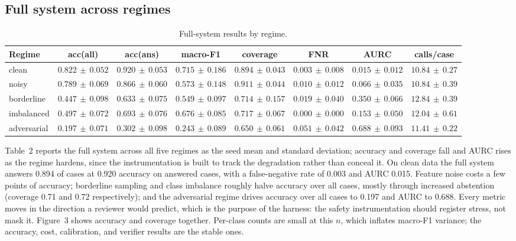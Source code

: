 \documentclass[12pt]{article}
\begin{document}
\subsection{Full system across regimes}
\begin{table}[htbp]
\centering
\small
\renewcommand{\arraystretch}{1.25}
\setlength{\tabcolsep}{5pt}
\begin{adjustbox}{max width=\linewidth}
\begin{tabular}{|l|c|c|c|c|c|c|c|}
\hline
\rowcolor{tblhead}
\textbf{Regime} & \textbf{acc(all)} & \textbf{acc(ans)} & \textbf{macro-F1} & \textbf{coverage} & \textbf{FNR} & \textbf{AURC} & \textbf{calls/case} \\ \hline
clean & $0.822\,{\pm}\,0.052$ & $0.920\,{\pm}\,0.053$ & $0.715\,{\pm}\,0.186$ & $0.894\,{\pm}\,0.043$ & $0.003\,{\pm}\,0.008$ & $0.015\,{\pm}\,0.012$ & $10.84\,{\pm}\,0.27$ \\
\hline
noisy & $0.789\,{\pm}\,0.069$ & $0.866\,{\pm}\,0.060$ & $0.573\,{\pm}\,0.148$ & $0.911\,{\pm}\,0.044$ & $0.010\,{\pm}\,0.012$ & $0.066\,{\pm}\,0.035$ & $10.84\,{\pm}\,0.39$ \\
\hline
borderline & $0.447\,{\pm}\,0.098$ & $0.633\,{\pm}\,0.075$ & $0.549\,{\pm}\,0.097$ & $0.714\,{\pm}\,0.157$ & $0.019\,{\pm}\,0.040$ & $0.350\,{\pm}\,0.066$ & $12.84\,{\pm}\,0.39$ \\
\hline
imbalanced & $0.497\,{\pm}\,0.072$ & $0.693\,{\pm}\,0.076$ & $0.676\,{\pm}\,0.085$ & $0.717\,{\pm}\,0.067$ & $0.000\,{\pm}\,0.000$ & $0.153\,{\pm}\,0.050$ & $12.04\,{\pm}\,0.61$ \\
\hline
adversarial & $0.197\,{\pm}\,0.071$ & $0.302\,{\pm}\,0.098$ & $0.243\,{\pm}\,0.089$ & $0.650\,{\pm}\,0.061$ & $0.051\,{\pm}\,0.042$ & $0.688\,{\pm}\,0.093$ & $11.41\,{\pm}\,0.22$ \\
\hline
\end{tabular}
\end{adjustbox}
\caption{Full-system results by regime.}
\label{tab:main}
\end{table}


Table~2 reports the full system across all five regimes as the seed mean and standard deviation; accuracy and coverage fall and AURC rises as the regime hardens, since the instrumentation is built to track the degradation rather than conceal it. On clean data the full system answers 0.894 of cases at 0.920 accuracy on answered cases, with a false-negative rate of 0.003 and AURC 0.015. Feature noise costs a few points of accuracy; borderline sampling and class imbalance roughly halve accuracy over all cases, mostly through increased abstention (coverage 0.71 and 0.72 respectively); and the adversarial regime drives accuracy over all cases to 0.197 and AURC to 0.688. Every metric moves in the direction a reviewer would predict, which is the purpose of the harness: the safety instrumentation should register stress, not mask it. Figure~3 shows accuracy and coverage together. Per-class counts are small at this $n$, which inflates macro-F1 variance; the accuracy, cost, calibration, and verifier results are the stable ones.
\end{document}
